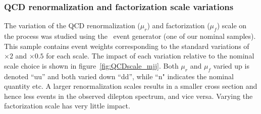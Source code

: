 {\subsubsection{QCD renormalization and factorization scale variations}
The variation of the QCD renormalization ($\mu_r$) and factorization ($\mu_f$) scale on the process was studied using the \sherpa\ event generator (one of our nominal samples).
This sample contains event weights corresponding to the standard variations of $\times 2$ and $\times 0.5$ for each scale.
The impact of each variation relative to the nominal scale choice is shown in figure~\ref{fig:QCDscale_mjj}.
Both $\mu_r$ and $\mu_f$ varied up is denoted ``uu'' and both varied down ``dd'', while ``n" indicates the nominal quantity etc.
A larger renormalization scales results in a smaller cross section and hence less events in the observed dilepton \pt spectrum, and vice versa.
Varying the factorization scale has very little impact.

}
